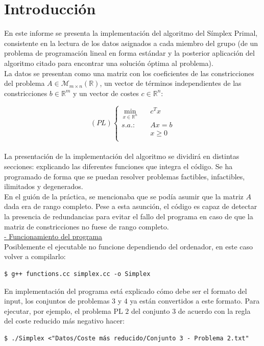 \documentclass[11pt]{article}
\newcommand{\R}{\mathbb{R}}
\newcommand{\M}{\mathcal{M}}
\begin{document}
\section{Introducción}

\noindent En este informe se presenta la implementación del algoritmo del
Símplex Primal, consistente en la lectura de los datos asignados a cada miembro
del grupo (de un problema de programación lineal en forma estándar y la
posterior aplicación del algoritmo citado para encontrar una solución óptima al
problema). \\

\noindent La datos se presentan como una matriz con los coeficientes de las
constricciones del problema $A \in \M_{m \times n}(\R)$, un vector de términos
independientes de las constricciones $b \in \mathbb{R}^m$ y un vector de costes
$c \in \mathbb{R}^n$:

\[
  (PL)
  \left\{
    \begin{aligned}
      \, \min \limits_{x \in \R^n} \quad & c^Tx \\
      s.a.: \quad & Ax=b \\
      & x \geq 0 \\
    \end{aligned}
  \right.
\] \\

\noindent La presentación de la implementación del algoritmo se dividirá en distintas secciones: explicando las diferentes funciones que integra el código. Se ha programado de forma que se puedan resolver problemas factibles,
infactibles, ilimitados y degenerados. \\

\noindent En el guión de la práctica, se mencionaba que se podía asumir que la
matriz $A$ dada era de rango completo. Pese a esta asunción, el código es capaz
de detectar la presencia de redundancias para evitar el fallo del programa en
caso de que la matriz de constricciones no fuese de rango completo. \\

\noindent \underline{\large{- Funcionamiento del programa}}\\

\noindent Posiblemente el ejecutable no funcione dependiendo del ordenador, en
este caso volver a compilarlo:
\begin{verbatim}
$ g++ functions.cc simplex.cc -o Simplex
\end{verbatim}
\noindent En implementación del programa está explicado cómo debe ser el formato
del input, los conjuntos de problemas $3$ y $4$ ya están convertidos a este
formato. Para ejecutar, por ejemplo, el problema PL $2$ del conjunto $3$ de
acuerdo con la regla del coste reducido más negativo hacer:
\begin{verbatim}
$ ./Simplex <"Datos/Coste más reducido/Conjunto 3 - Problema 2.txt"
\end{verbatim}
\end{document}
